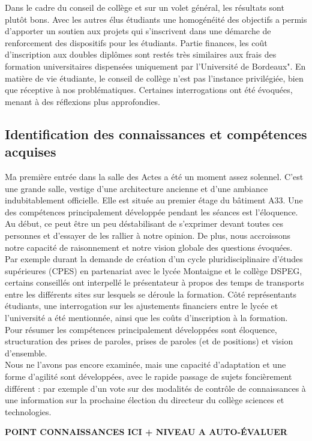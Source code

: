 \documentclass{article}
\begin{document}
Dans le cadre du conseil de collège et sur un volet général, les résultats sont plutôt bons. 
Avec les autres élus étudiants une homogénéité des objectifs a permis d'apporter un soutien aux projets qui s'inscrivent dans une démarche de renforcement des dispositifs pour les étudiants. 
Partie finances, les coût d'inscription aux doubles diplômes sont restés très similaires aux frais des formation universitaires dispensées uniquement par l'Université de Bordeaux". 
En matière de vie étudiante, le conseil de collège n'est pas l'instance privilégiée, bien que réceptive à nos problématiques. 
Certaines interrogations ont été évoquées, menant à des réflexions plus approfondies.

\subsection{Identification des connaissances et compétences acquises}
Ma première entrée dans la salle des Actes a été un moment assez solennel. 
C'est une grande salle, vestige d'une architecture ancienne et d'une ambiance indubitablement officielle. 
Elle est située au premier étage du bâtiment A33. 
Une des compétences principalement développée pendant les séances est l'éloquence. 
Au début, ce peut être un peu déstabilisant de s'exprimer devant toutes ces personnes et d'essayer de les rallier à notre opinion. 
De plus, nous accroissons notre capacité de raisonnement et notre vision globale des questions évoquées. 
Par exemple durant la demande de création d'un cycle pluridisciplinaire d'études supérieures (CPES) en partenariat avec le lycée Montaigne et le collège DSPEG, certains conseillés ont interpellé le présentateur à propos des temps de transports entre les différents sites sur lesquels se déroule la formation. 
Côté représentants étudiants, une interrogation sur les ajustements financiers entre le lycée et l'université a été mentionnée, ainsi que les coûts d'inscription à la formation.
Pour résumer les compétences principalement développées sont éloquence, structuration des prises de paroles, prises de paroles (et de positions) et vision d'ensemble. \\ 
Nous ne l'avons pas encore examinée, mais une capacité d'adaptation et une forme d'agilité sont développées, avec le rapide passage de sujets foncièrement différent : par exemple d'un vote sur des modalités de contrôle de connaissances à une information sur la prochaine élection du directeur du collège sciences et technologies. \par
\textbf{POINT CONNAISSANCES ICI + NIVEAU A AUTO-ÉVALUER}
\newpage
\end{document}
